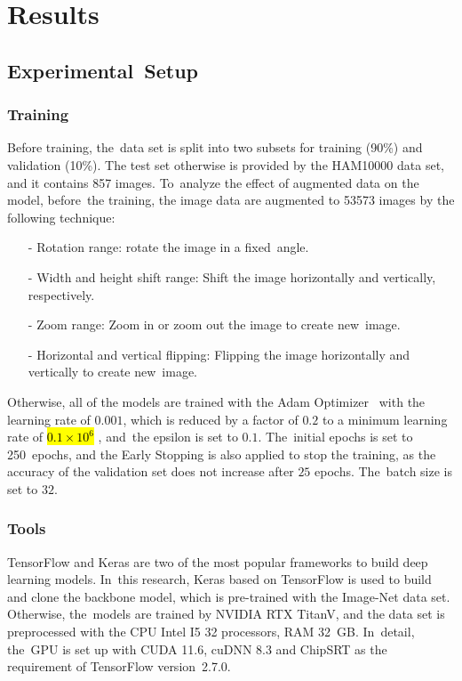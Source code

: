 \documentclass[sensors,article,accept,pdftex,moreauthors]{Definitions/mdpi}
\begin{document}
\section{Results}
\unskip
\subsection{Experimental~Setup}
\unskip
\subsubsection{Training}
Before training, the~data set is split into two subsets for training (90\%) and validation (10\%). The test set otherwise is provided by the HAM10000 data set, and it contains 857 images. To~analyze the effect of augmented data on the model, before~the training, the image data are augmented to 53573 images by the following technique:




\begin{itemize}
\item[-]	Rotation range: rotate the image in a fixed~angle.
\item[-]		Width and height shift range: Shift the image horizontally and vertically, respectively.
\item[-]		Zoom range:  Zoom in or zoom out the image to create new~image. 
\item[-]		Horizontal and vertical flipping: Flipping the image horizontally and vertically to create new~image.
\end{itemize}




Otherwise, all of the models are trained with the Adam Optimizer~\cite{6980} with the learning rate of $0.001$, which is reduced by a factor of $0.2$ to a minimum learning rate of \hl{$0.1 \times 10^6$}%
, and~the epsilon is set to $0.1$. The~initial epochs is set to 250~epochs, and the Early Stopping is also applied to stop the training, as the accuracy of the validation set does not increase after $25$ epochs. The~batch size is set to $32$.

\subsubsection{Tools}
TensorFlow and Keras are two of the most popular frameworks to build deep learning models. In~this research, Keras based on TensorFlow is used to build and clone the backbone model, which is pre-trained with the Image-Net data set. Otherwise, the~models are trained by NVIDIA RTX TitanV, and the data set is preprocessed with the CPU Intel I5 32 processors, RAM 32~GB. In~detail, the~GPU is set up with CUDA 11.6, cuDNN 8.3 and ChipSRT as the requirement of TensorFlow version~2.7.0.
\end{document}
